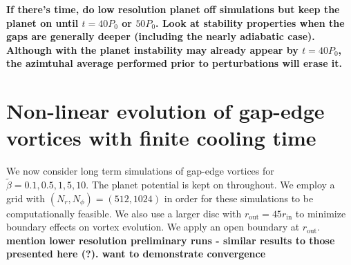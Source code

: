 



{\bf
If there's time, do low resolution planet off simulations but keep the planet on
until $t=40P_0$ or $50P_0$. Look at stability properties when the gaps
are generally deeper (including the nearly adiabatic case). Although
with the planet instability may already appear by $t=40P_0$, the
azimtuhal average performed prior to perturbations will erase it. 
}



\section{Non-linear evolution of
  gap-edge vortices with finite cooling time}\label{nonlinear} 

We now consider long term simulations of gap-edge vortices for
$\tilde{\beta}=0.1,0.5,1,5,10$. The planet potential is kept on
throughout.  
We employ a grid with $(N_r,N_{\phi})=(512,1024)$ 
in order for these simulations to be computationally feasible. We also use a larger
disc with $r_{\mathrm{out}}=45r_{\mathrm{in}}$ to minimize boundary
effects on vortex evolution. We apply an open boundary at
$r_\mathrm{out}$. {\bf mention lower resolution preliminary runs -
  similar results to those presented here (?). want to demonstrate convergence}



